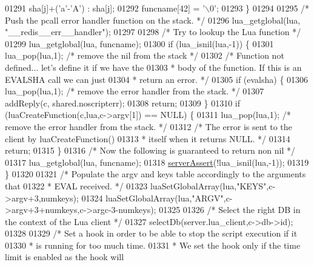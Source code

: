 \begin{DoxyCode}
{{{{{{{{{{{01291                 sha[j]+(\textcolor{stringliteral}{'a'}-\textcolor{stringliteral}{'A'}) : sha[j];
01292         funcname[42] = \textcolor{stringliteral}{'\(\backslash\)0'};
01293     \}
01294 
01295     \textcolor{comment}{/* Push the pcall error handler function on the stack. */}
01296     lua\_getglobal(lua, \textcolor{stringliteral}{"\_\_redis\_\_err\_\_handler"});
01297 
01298     \textcolor{comment}{/* Try to lookup the Lua function */}
01299     lua\_getglobal(lua, funcname);
01300     \textcolor{keywordflow}{if} (lua\_isnil(lua,-1)) \{
01301         lua\_pop(lua,1); \textcolor{comment}{/* remove the nil from the stack */}
01302         \textcolor{comment}{/* Function not defined... let's define it if we have the}
01303 \textcolor{comment}{         * body of the function. If this is an EVALSHA call we can just}
01304 \textcolor{comment}{         * return an error. */}
01305         \textcolor{keywordflow}{if} (evalsha) \{
01306             lua\_pop(lua,1); \textcolor{comment}{/* remove the error handler from the stack. */}
01307             addReply(c, shared.noscripterr);
01308             \textcolor{keywordflow}{return};
01309         \}
01310         \textcolor{keywordflow}{if} (luaCreateFunction(c,lua,c->argv[1]) == NULL) \{
01311             lua\_pop(lua,1); \textcolor{comment}{/* remove the error handler from the stack. */}
01312             \textcolor{comment}{/* The error is sent to the client by luaCreateFunction()}
01313 \textcolor{comment}{             * itself when it returns NULL. */}
01314             \textcolor{keywordflow}{return};
01315         \}
01316         \textcolor{comment}{/* Now the following is guaranteed to return non nil */}
01317         lua\_getglobal(lua, funcname);
01318         \hyperlink{server_8h_a88114b5169b4c382df6b56506285e56a}{serverAssert}(!lua\_isnil(lua,-1));
01319     \}
01320 
01321     \textcolor{comment}{/* Populate the argv and keys table accordingly to the arguments that}
01322 \textcolor{comment}{     * EVAL received. */}
01323     luaSetGlobalArray(lua,\textcolor{stringliteral}{"KEYS"},c->argv+3,numkeys);
01324     luaSetGlobalArray(lua,\textcolor{stringliteral}{"ARGV"},c->argv+3+numkeys,c->argc-3-numkeys);
01325 
01326     \textcolor{comment}{/* Select the right DB in the context of the Lua client */}
01327     selectDb(server.lua\_client,c->db->id);
01328 
01329     \textcolor{comment}{/* Set a hook in order to be able to stop the script execution if it}
01330 \textcolor{comment}{     * is running for too much time.}
01331 \textcolor{comment}{     * We set the hook only if the time limit is enabled as the hook will}
}}}}}}}}}}}
\end{DoxyCode}
